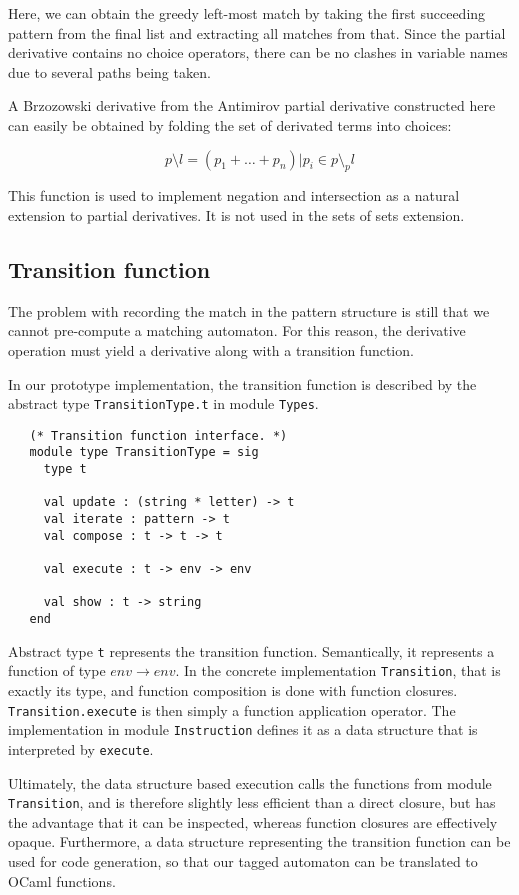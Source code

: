 Here, we can obtain the greedy left-most match by taking the first succeeding
pattern from the final list and extracting all matches from that. Since the
partial derivative contains no choice operators, there can be no clashes in
variable names due to several paths being taken.

A Brzozowski derivative from the Antimirov partial derivative constructed here
can easily be obtained by folding the set of derivated terms into choices:

\[p \setminus l = (p_1 + \dots + p_n) | p_i \in p \setminus_p l \]

This function is used to implement negation and intersection as a natural
extension to partial derivatives. It is not used in the sets of sets extension.


\subsection{Transition function}

The problem with recording the match in the pattern structure is still that we
cannot pre-compute a matching automaton. For this reason, the derivative
operation must yield a derivative along with a transition function.

In our prototype implementation, the transition function is described by the
abstract type \texttt{TransitionType.t} in module \texttt{Types}.

\begin{lstlisting}
   (* Transition function interface. *)
   module type TransitionType = sig
     type t

     val update : (string * letter) -> t
     val iterate : pattern -> t
     val compose : t -> t -> t

     val execute : t -> env -> env

     val show : t -> string
   end
\end{lstlisting}

Abstract type \texttt{t} represents the transition function. Semantically, it
represents a function of type $\mathit{env} \to \mathit{env}$. In the concrete
implementation \texttt{Transition}, that is exactly its type, and function
composition is done with function closures. \texttt{Transition.execute} is then
simply a function application operator. The implementation in module
\texttt{Instruction} defines it as a data structure that is interpreted by
\texttt{execute}.

Ultimately, the data structure based execution calls the functions from module
\texttt{Transition}, and is therefore slightly less efficient than a direct
closure, but has the advantage that it can be inspected, whereas function
closures are effectively opaque. Furthermore, a data structure representing the
transition function can be used for code generation, so that our tagged
automaton can be translated to OCaml functions.

